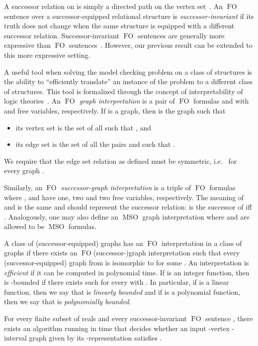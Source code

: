 \documentclass{CSML}
\newcommand{\FO}{\ensuremath{\operatorname{FO}}\xspace}
\newcommand{\MSO}{\ensuremath{\operatorname{MSO}}\xspace}
\theoremstyle{plain}\newtheorem{claim}[thm]{Claim}
\begin{document}
A successor relation on  is simply a directed path on the vertex set~.
An \FO sentence over a successor-equipped relational structure is 
{\em successor-invariant} if its truth does not change when the same
structure is equipped with a different successor relation.
Successor-invariant \FO sentences are generally more expressive than \FO sentences~\cite{Ros07}.
However, our previous result can be extended to this more expressive setting.

A useful tool when solving the model checking problem on a class of
structures is the ability to ``efficiently translate'' an instance of the problem to a different class of structures.
This tool is formalized through the concept of interpretability of logic theories~\cite{Rab64}.
An {\em\FO graph interpretation} is a pair  of {\em \FO} formulas  and  with  and  free variables, respectively.
If  is a graph, then  is the graph such that
\begin{itemize}
\item its vertex set is the set of all  such that , and
\item its edge set is the set of all the pairs  and  such that .
\end{itemize}
We require that the edge set relation as defined must be symmetric,
i.e.~ for every graph .

Similarly, an {\em \FO successor-graph interpretation} is a triple  of {\em \FO} formulas
where ,  and  have one, two and two free variables, respectively.
The meaning of  and  is the same and   should represent the successor relation:
 is the successor of  iff .
Analogously, one may also define an \MSO graph interpretation
where  and  are allowed to be \MSO formulas.

A class  of (successor-equipped) graphs has an \FO interpretation in a class  of graphs
if there exists an \FO (successor-)graph interpretation  such that every (successor-equipped) graph  from 
is isomorphic to  for some .
An interpretation is {\em efficient} if it can be computed in polynomial time.
If  is an integer function, then  is -bounded
if there exists such  for every  with .
In particular, if  is a linear function, then we say that  is {\em linearly bounded} and
if  is a polynomial function, then we say that  is {\em polynomially bounded}.

\begin{thm}
\label{thm-L-interval-succ}
For every finite subset  of reals and every successor-invariant \FO sentence , there exists an algorithm
running in time  that decides whether an input -vertex -interval graph 
given by its -representation satisfies .
\end{thm}
\end{document}
